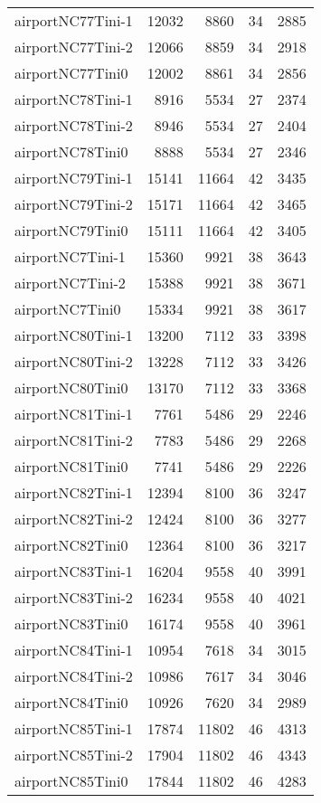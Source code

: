 \begin{longtable}{lrrrr}
airportNC77Tini-1 & 12032 & 8860 & 34 & 2885 \\
airportNC77Tini-2 & 12066 & 8859 & 34 & 2918 \\
airportNC77Tini0 & 12002 & 8861 & 34 & 2856 \\
airportNC78Tini-1 & 8916 & 5534 & 27 & 2374 \\
airportNC78Tini-2 & 8946 & 5534 & 27 & 2404 \\
airportNC78Tini0 & 8888 & 5534 & 27 & 2346 \\
airportNC79Tini-1 & 15141 & 11664 & 42 & 3435 \\
airportNC79Tini-2 & 15171 & 11664 & 42 & 3465 \\
airportNC79Tini0 & 15111 & 11664 & 42 & 3405 \\
airportNC7Tini-1 & 15360 & 9921 & 38 & 3643 \\
airportNC7Tini-2 & 15388 & 9921 & 38 & 3671 \\
airportNC7Tini0 & 15334 & 9921 & 38 & 3617 \\
airportNC80Tini-1 & 13200 & 7112 & 33 & 3398 \\
airportNC80Tini-2 & 13228 & 7112 & 33 & 3426 \\
airportNC80Tini0 & 13170 & 7112 & 33 & 3368 \\
airportNC81Tini-1 & 7761 & 5486 & 29 & 2246 \\
airportNC81Tini-2 & 7783 & 5486 & 29 & 2268 \\
airportNC81Tini0 & 7741 & 5486 & 29 & 2226 \\
airportNC82Tini-1 & 12394 & 8100 & 36 & 3247 \\
airportNC82Tini-2 & 12424 & 8100 & 36 & 3277 \\
airportNC82Tini0 & 12364 & 8100 & 36 & 3217 \\
airportNC83Tini-1 & 16204 & 9558 & 40 & 3991 \\
airportNC83Tini-2 & 16234 & 9558 & 40 & 4021 \\
airportNC83Tini0 & 16174 & 9558 & 40 & 3961 \\
airportNC84Tini-1 & 10954 & 7618 & 34 & 3015 \\
airportNC84Tini-2 & 10986 & 7617 & 34 & 3046 \\
airportNC84Tini0 & 10926 & 7620 & 34 & 2989 \\
airportNC85Tini-1 & 17874 & 11802 & 46 & 4313 \\
airportNC85Tini-2 & 17904 & 11802 & 46 & 4343 \\
airportNC85Tini0 & 17844 & 11802 & 46 & 4283 \\

\end{longtable}

